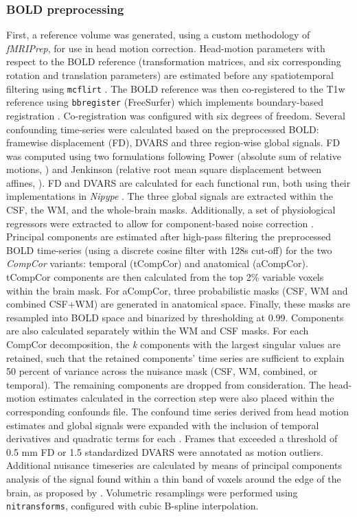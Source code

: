 \documentclass[conference]{ieeeconf}
\begin{document}
\subsubsection*{BOLD preprocessing} 
First, a reference
volume was generated, using a custom methodology of \emph{fMRIPrep}, for
use in head motion correction. Head-motion parameters with respect to
the BOLD reference (transformation matrices, and six corresponding
rotation and translation parameters) are estimated before any
spatiotemporal filtering using \texttt{mcflirt} \cite{mcflirt}. The BOLD reference was then co-registered to the
T1w reference using \texttt{bbregister} (FreeSurfer) which implements
boundary-based registration \cite{bbr}. Co-registration was configured
with six degrees of freedom. Several confounding time-series were
calculated based on the preprocessed BOLD: framewise displacement
(FD), DVARS and three region-wise global signals. FD was computed using
two formulations following Power (absolute sum of relative motions,
\cite{power_fd_dvars}) and Jenkinson (relative root mean square
displacement between affines, \cite{mcflirt}). FD and DVARS are
calculated for each functional run, both using their implementations in
\emph{Nipype} \cite{power_fd_dvars}.
The three global signals are extracted within the CSF, the WM, and the
whole-brain masks. Additionally, a set of physiological regressors were
extracted to allow for component-based noise correction
\cite{compcor}. Principal components are estimated
after high-pass filtering the preprocessed BOLD time-series
(using a discrete cosine filter with 128s cut-off) for the two
\emph{CompCor} variants: temporal (tCompCor) and anatomical (aCompCor).
tCompCor components are then calculated from the top 2\% variable voxels
within the brain mask. For aCompCor, three probabilistic masks (CSF, WM
and combined CSF+WM) are generated in anatomical space. Finally,
these masks are resampled into BOLD space and binarized by thresholding
at 0.99. Components are also
calculated separately within the WM and CSF masks. For each CompCor
decomposition, the \emph{k} components with the largest singular values
are retained, such that the retained components' time series are
sufficient to explain 50 percent of variance across the nuisance mask
(CSF, WM, combined, or temporal). The remaining components are dropped
from consideration. The head-motion estimates calculated in the
correction step were also placed within the corresponding confounds
file. The confound time series derived from head motion estimates and
global signals were expanded with the inclusion of temporal derivatives
and quadratic terms for each \cite{confounds_satterthwaite_2013}.
Frames that exceeded a threshold of 0.5 mm FD or 1.5 standardized DVARS
were annotated as motion outliers. Additional nuisance timeseries are
calculated by means of principal components analysis of the signal found
within a thin band of voxels around the edge of the
brain, as proposed by \cite{patriat_improved_2017}. Volumetric
resamplings were performed using \texttt{nitransforms}, configured with
cubic B-spline interpolation.
\end{document}
